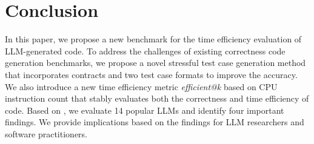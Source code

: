 \section{Conclusion}\label{sec:conclusion}

In this paper, we propose a new benchmark \bench for the time efficiency evaluation of LLM-generated code. To address the challenges of existing correctness code generation benchmarks, we propose a novel stressful test case generation method \tool that incorporates contracts and two test case formats to improve the accuracy. We also introduce a new time efficiency metric \textit{efficient@k} based on CPU instruction count that stably evaluates both the correctness and time efficiency of code. Based on \bench, we evaluate 14 popular LLMs and identify four important findings. We provide implications based on the findings for LLM researchers and software practitioners.